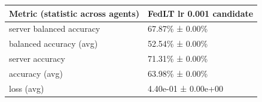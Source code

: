 \begin{tabular}{ll}
\hline
 Metric (statistic across agents)   & FedLT lr 0.001 candidate   \\
\hline
 server balanced accuracy           & 67.87\% ± 0.00\%             \\
 balanced accuracy (avg)            & 52.54\% ± 0.00\%             \\
 server accuracy                    & 71.31\% ± 0.00\%             \\
 accuracy (avg)                     & 63.98\% ± 0.00\%             \\
 loss (avg)                         & 4.40e-01 ± 0.00e+00        \\
\hline
\end{tabular}